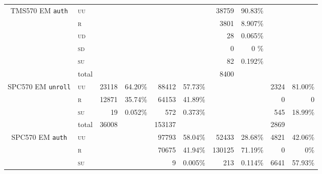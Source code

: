 \documentclass[10pt]{article}
\newcommand{\TI}{TMS570\xspace}
\newcommand{\ST}{SPC570\xspace}
\newcommand{\unroll}{\texttt{unroll}\xspace}
\newcommand{\auth}{\texttt{auth}\xspace}
\newcommand{\UU}{\textsc{uu}\xspace}
\newcommand{\UD}{\textsc{ud}\xspace}
\newcommand{\SU}{\textsc{su}\xspace}
\newcommand{\SD}{\textsc{sd}\xspace}
\newcommand{\R}{\textsc{r}\xspace}
\begin{document}
\begin{table}[H]
\begin{tabular}{ll rr rr rr rr}
    \midrule

    \multicolumn{1}{c}{\multirow{3}{*}{ \parbox{2cm}{\TI EM \auth}}}

    & \UU    
    & & 
    & & 
    & 38759  & 90.83\%  
    & &                            
    \\
    & \R   
    & & 
    & & 
    & 3801   & 8.907\%  
    & &                            
    \\
    & \UD  
    & & 
    & & 
    & 28     & 0.065\%  
    & &                            
    \\
    & \SD     
    & & 
    & & 
    & 0      & 0    \%  
    & &                            
     \\
    & \SU      
    & & 
    & & 
    & 82     & 0.192\%  
    & &                            
    \\

    \cmidrule(l){2-10}
    & total    
    & & 
    & & 
    & 8400   &           
    & &                            
      \\   
   
    \midrule

    \multicolumn{1}{c}{\multirow{3}{*}{ \parbox{2cm}{\ST EM \unroll}}}

    & \UU    
    & 23118  & 64.20\%
    & 88412  & 57.73\%  
    & & 
    & 2324 & 81.00\%                          
    \\
    & \R   
    & 12871  & 35.74\%
    & 64153  & 41.89\%  
    & & 
    & 0 & 0%
    \\
    & \SU      
    & 19     & 0.052\%
    & 572    & 0.373\%  
    & & 
    & 545 & 18.99\%                           
    \\

    \cmidrule(l){2-10}
    & total    
    &  36008  &           
    & 153137 & 
    &  & 
    & 2869&                           
      \\      

    \midrule

    \multicolumn{1}{c}{\multirow{3}{*}{ \parbox{2cm}{\ST EM \auth}}}

    & \UU    
    & & 
    & 97793  & 58.04\%        
    & 52433   & 28.68\%  
    & 4821 &   42.06\%        
    \\
    & \R   
    & & 
    & 70675  & 41.94\%        
    & 130125  & 71.19\%  
    & 0 &       0\%    
    \\
    & \SU      
    & & 
    &  9     & 0.005\%        
    &  213   & 0.114\%  
    & 6641   & 57.93\%           
    \\


\end{tabular}
\end{table}
\end{document}
